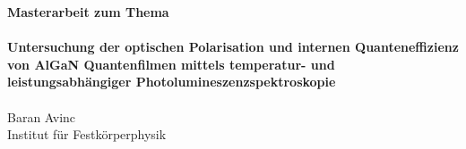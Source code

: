 
\begin{titlepage}
		\pagestyle{fancy}
		\centering\textbf{\large Masterarbeit zum Thema}\\
		\vspace{3cm} 
		\noindent{\color{RoyalPurple}\rule{\textwidth}{1pt}} \\
		\vspace{0.5cm} 
		\centering\textbf{\large Untersuchung der optischen Polarisation und internen Quanteneffizienz von AlGaN Quantenfilmen mittels temperatur- und leistungsabhängiger Photolumineszenzspektroskopie} \\
		\vspace{0.25cm} 
		\noindent{\color{RoyalPurple}\rule{\textwidth}{1pt}} \\
		\vspace{3cm}
		\centering Baran Avinc \\
		\vspace{3cm}
		\centering Institut für Festkörperphysik
		\vspace{\fill} \\
\end{titlepage}


